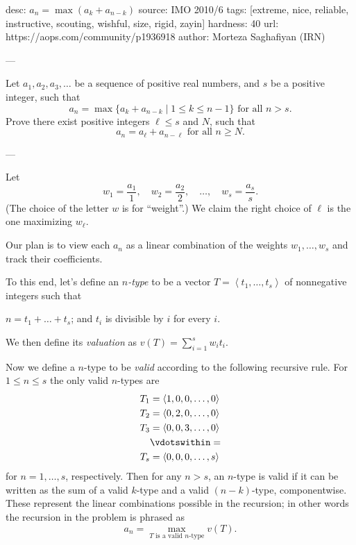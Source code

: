 desc:  $a_n = \max (a_k + a_{n-k})$
source:  IMO 2010/6
tags:  [extreme, nice, reliable, instructive, scouting, wishful, size, rigid, zayin]
hardness: 40
url: https://aops.com/community/p1936918
author: Morteza Saghafiyan (IRN)

---

Let $a_1, a_2, a_3, \dots$ be a sequence of positive real numbers, and $s$ be a positive integer, such that
\[
  a_n =
  \max \{ a_k + a_{n-k} \mid 1 \leq k \leq n-1 \}
  \text{ for all $n > s$}.
\]
Prove there exist positive integers $\ell \leq s$ and $N$, such that
\[
  a_n =
  a_{\ell} + a_{n - \ell} \text{ for all $n \ge N$}.
\]

---

Let \[ w_1 = \frac{a_1}{1}, \quad w_2 = \frac{a_2}{2},
    \quad \dots, \quad w_s = \frac{a_s}{s}. \]
(The choice of the letter $w$ is for ``weight''.)
We claim the right choice of $\ell$
is the one maximizing $w_\ell$.

Our plan is to view each $a_n$ as a linear combination
of the weights $w_1, \dots, w_s$ and track their coefficients.

To this end, let's define an \emph{$n$-type}
to be a vector $T = \left< t_1, \dots, t_s\right>$
of nonnegative integers such that
\begin{itemize}
  \ii $n = t_1 + \dots + t_s$; and
  \ii $t_i$ is divisible by $i$ for every $i$.
\end{itemize}
We then define its \emph{valuation} as $v(T) = \sum_{i=1}^s w_i t_i$.

Now we define a $n$-type to be \emph{valid}
according to the following recursive rule.
For $1 \le n \le s$ the only valid $n$-types are
\begin{align*}
  T_1 &= \left< 1, 0, 0, \dots, 0 \right> \\
  T_2 &= \left< 0, 2, 0, \dots, 0 \right> \\
  T_3 &= \left< 0, 0, 3, \dots, 0 \right> \\
  &\vdotswithin= \\
  T_s &= \left< 0, 0, 0, \dots, s \right>
\end{align*}
for $n = 1, \dots, s$, respectively.
Then for any $n > s$, an $n$-type is valid
if it can be written as the sum of a valid $k$-type
and a valid $(n-k)$-type, componentwise.
These represent the linear combinations possible in the recursion;
in other words the recursion in the problem is phrased as
\[ a_n = \max_{T \text{ is a valid $n$-type}} v(T). \]

